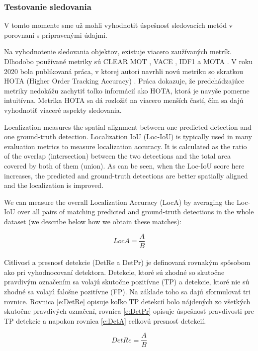 \subsubsection{Testovanie sledovania}
V tomto momente sme už mohli vyhodnotiť úspešnosť sledovacích metód v porovnaní s pripravenými údajmi.

Na vyhodnotenie sledovania objektov, existuje viacero zaužívaných metrík. Dlhodobo používané metriky sú CLEAR MOT \cite{clear}, VACE \cite{vace}, IDF1 \cite{idf} a MOTA \cite{mota}. V roku 2020 bola publikovaná práca, v ktorej autori navrhli novú metriku so skratkou HOTA (Higher Order Tracking Accuracy) \cite{hota}. Práca dokazuje, že predchádzajúce metriky nedokážu zachytiť toľko informácií ako HOTA, ktorá je navyše pomerne intuitívna. Metrika HOTA sa dá rozložiť na viacero menších častí, čím sa dajú vyhodnotiť viaceré aspekty sledovania.

Localization measures the spatial alignment between one predicted detection and one ground-truth detection. Localization IoU (Loc-IoU) is typically used in many evaluation metrics to measure localization accuracy. It is calculated as the ratio of the overlap (intersection) between the two detections and the total area covered by both of them (union). As can be seen, when the Loc-IoU score here increases, the predicted and ground-truth detections are better spatially aligned and the localization is improved.

We can measure the overall Localization Accuracy (LocA) by averaging the Loc-IoU over all pairs of matching predicted and ground-truth detections in the whole dataset (we describe below how we obtain these matches):

\begingroup
\large
\begin{equation}
LocA = \frac{A}{B}
\label{e:DetRe}
\end{equation}
\endgroup
\\
Citlivosť a presnosť detekcie (DetRe a DetPr) je definovaná rovnakým spôsobom ako pri vyhodnocovaní detektora. Detekcie, ktoré sú zhodné so skutočne pravdivým označením sa volajú skutočne pozitívne (TP) a detekcie, ktoré nie sú zhodné sa volajú falošne pozitívne (FP). Na základe toho sa dajú sformulovať tri rovnice. 
Rovnica \ref{e:DetRe} opisuje koľko TP detekcií bolo nájdených zo všetkých skutočne pravdivých označení, rovnica \ref{e:DetPr} opisuje úspešnosť pravdivosti pre TP detekcie a napokon rovnica \ref{e:DetA} celkovú presnosť detekcií.

\begingroup
\large
\begin{equation}
DetRe = \frac{A}{B}
\label{e:DetRe}
\end{equation}

